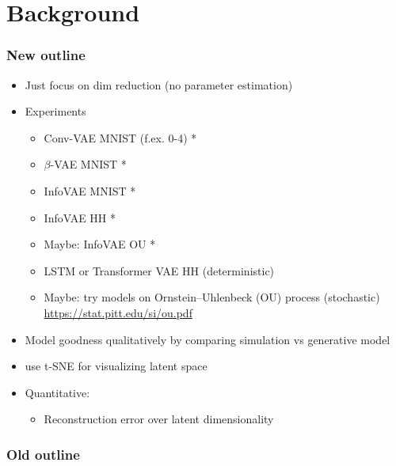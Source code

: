 \section{Background}\label{sec:Theory}

\subsubsection*{New outline}

\begin{itemize}
    \item Just focus on dim reduction (no parameter estimation)
    \item Experiments
    \begin{itemize}
        \item Conv-VAE MNIST (f.ex. 0-4) *
        \item $\beta$-VAE MNIST *
        \item InfoVAE MNIST *
        \item InfoVAE HH *
        \item Maybe: InfoVAE OU *
        \item LSTM or Transformer VAE HH (deterministic)
        \item Maybe: try models on Ornstein–Uhlenbeck (OU) process (stochastic) \url{https://stat.pitt.edu/si/ou.pdf}
    \end{itemize}
    \item Model goodness qualitatively by comparing simulation vs generative model
    \item use t-SNE for visualizing latent space
    \item Quantitative:
    \begin{itemize}
        \item Reconstruction error over latent dimensionality
    \end{itemize}
\end{itemize}

\subsubsection*{Old outline}

